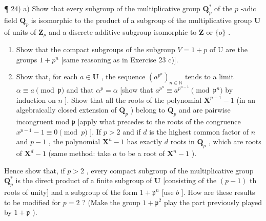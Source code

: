 ¶ 24) a) Show that every subgroup of the multiplicative group \(\mathbf{Q}_p^*\) of the \(p\) -adic field \(\mathbf{Q}_p\) is isomorphic to the product of a subgroup of the multiplicative group \(\mathbf{U}\) of units of \(\mathbf{Z}_p\) and a discrete additive subgroup isomorphic to \(\mathbf{Z}\) or \(\{o\}\) .

\begin{enumerate}
\def\labelenumi{\alph{enumi})}
\setcounter{enumi}{1}
\item
  Show that the compact subgroups of the subgroup \(V = 1 + p\) of U are the groups \(1 + p^{n}\) {[}same reasoning as in Exercise 23 c){]}.
\item
  Show that, for each \(a \in \mathbf{U}\) , the sequence \((a^{p^n})_{n \in \mathbb{N}}\) tends to a limit \(\alpha \equiv a \pmod{\mathfrak{p}}\) and that \(\alpha^p = \alpha\) {[}show that \(a^{p^n} \equiv a^{p^{n-1}} \pmod{\mathfrak{p}^n}\) by induction on \(n\) {]}. Show that all the roots of the polynomial \(\mathbf{X}^{p-1} - 1\) (in an algebraically closed extension of \(\mathbf{Q}_p\) ) belong to \(\mathbf{Q}_p\) and are pairwise incongruent mod \(\mathfrak{p}\) {[}apply what precedes to the roots of the congruence \(x^{p-1} - 1 \equiv 0 \pmod{p}\) {]}. If \(p > 2\) and if \(d\) is the highest common factor of \(n\) and \(p - 1\) , the polynomial \(\mathbf{X}^n - 1\) has exactly \(d\) roots in \(\mathbf{Q}_p\) , which are roots of \(\mathbf{X}^d - 1\) (same method: take \(a\) to be a root of \(\mathbf{X}^n - 1\) ).
\end{enumerate}

Hence show that, if \(p > 2\) , every compact subgroup of the multiplicative group \(\mathbf{Q}_p^*\) is the direct product of a finite subgroup of \(\mathbf{U}\) {[}consisting of the \((p - 1)\) th roots of unity{]} and a subgroup of the form \(1 + \mathfrak{p}^n\) {[}use \(b\) {]}. How are these results to be modified for \(p = 2\) ? (Make the group \(1 + \mathfrak{p}^2\) play the part previously played by \(1 + \mathfrak{p}\) ).

